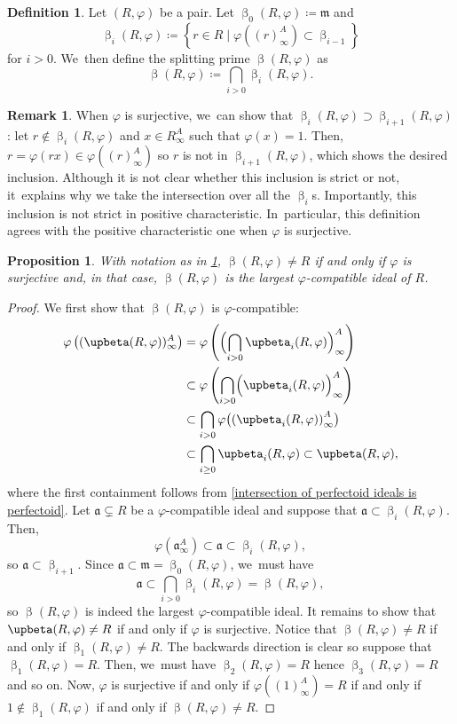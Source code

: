 \documentclass[JEP,XML,SOM,Unicode,published]{cedram}
\let\autoref\cref
\theoremstyle{plain}
\newtheorem{proposition}[theorem]{Proposition}
\theoremstyle{definition}
\newtheorem{definition}[theorem]{Definition}
\newtheorem{remark}[theorem]{Remark}
\numberwithin{equation}{theorem}
\newcommand{\fra}{\mathfrak{a}}
\newcommand{\fram}{\mathfrak{m}}
\renewcommand{\phi}{\varphi}
\newcommand{\rphi}{(R,\phi)}
\newcommand{\rafty}{R^A_\infty}
\begin{document}
\begin{definition}\label{definition splitting prime}
Let $\rphi$ be a pair. Let $\upbeta_0\rphi\coloneqq \fram$ and
\[
\upbeta_i\rphi\coloneqq \left\{r\in R\mid \phi\left((r)^A_\infty\right)\subset\upbeta_{i-1}\right\}
\]
for $i>0$. We~then define the splitting prime $\upbeta\rphi$ as
\[
\upbeta\rphi\coloneqq \bigcap_{i>0}\upbeta_i\rphi.
\]
\end{definition}

\begin{remark}
When $\phi$ is surjective, we~can show that $\upbeta_i\rphi\supset\upbeta_{i+1}\rphi$: let $r\notin \upbeta_i\rphi$ and $x\in \rafty$ such that $\phi(x)=1$. Then, $r=\phi(rx)\in \phi\left((r)_\infty^A\right)$ so $r$ is not in $\upbeta_{i+1}\rphi$, which shows the desired inclusion. Although it is not clear whether this inclusion is strict or not, it~explains why we take the intersection over all the $\upbeta_i$s. Importantly, this inclusion is not strict in positive characteristic. In~particular, this definition agrees with the positive characteristic one when $\phi$ is surjective.
\end{remark}

\begin{proposition}\label{basic ppties splitting prime}
With notation as in \autoref{definition splitting prime}, $\upbeta\rphi\neq R$ if and only if $\phi$ is surjective and, in that case, $\upbeta\rphi$ is the largest $\phi$-compatible ideal of $R$.
\end{proposition}

\begin{proof}
We first show that $\upbeta\rphi$ is $\phi$-compatible:
\begin{align*}
\phi\left((\upbeta\rphi)^A_\infty\right)&=\phi\left(\Bigl(\bigcap_{i>0} \upbeta_i\rphi\Bigr)^A_\infty\right)\\
&\subset \phi\left(\bigcap_{i>0} \Bigl(\upbeta_i\rphi \Bigr)^A_\infty \right) \\
&\subset \bigcap_{i>0} \phi\bigl( \left(\upbeta_i\rphi\right)^A_\infty\bigr) \\
&\subset \bigcap_{i\geq 0} \upbeta_i\rphi \subset \upbeta\rphi,
\end{align*}
where the first containment follows from \autoref{intersection of perfectoid ideals is perfectoid}.
Let $\fra\subsetneq R$ be a $\phi$-compatible ideal and suppose that $\fra\subset\upbeta_i\rphi$. Then,
\[
\phi\left(\fra^A_\infty\right)\subset \fra\subset \upbeta_i\rphi,
\]
so $\fra\subset\upbeta_{i+1}$. Since $\fra\subset\fram=\upbeta_0\rphi$, we~must have
\[
\fra\subset \bigcap_{i>0}\upbeta_i\rphi= \upbeta\rphi,
\]
so $\upbeta\rphi$ is indeed the largest $\phi$-compatible ideal. It remains to show that $\upbeta\rphi\neq\nobreak R$ if and only if $\phi$ is surjective. Notice that $\upbeta\rphi\neq R$ if and only if $\upbeta_1\rphi\neq R$. The backwards direction is clear so suppose that $\upbeta_1\rphi=R$. Then, we~must have $\upbeta_2\rphi=R$ hence $\upbeta_3\rphi=R$ and so on. Now, $\phi$ is surjective if and only if $\phi\left((1)^A_\infty\right)=R$ if and only if $1\notin \upbeta_1\rphi$ if and only if $\upbeta\rphi\neq R$.
\end{proof}
\end{document}
